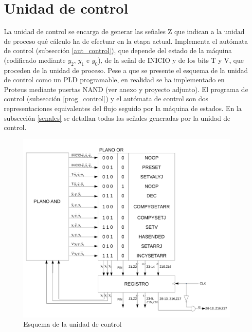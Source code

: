 \documentclass[12pt,a4paper,oneside]{article}
\begin{document}
\section{Unidad de control} \label{ud_control}
La unidad de control se encarga de generar las señales Z que indican a la unidad de proceso qué 
cálculo ha de efectuar en la etapa actual. Implementa el autómata de control (subsección \ref{aut_control}), que depende del estado 
de la máquina (codificado mediante $y_2$, $y_1$ e $y_0$), de la señal de INICIO y de los bits T y V, 
que proceden de la unidad de proceso. Pese a que se presente el esquema de la unidad de control como 
un PLD programable, en realidad se ha implementado en Proteus mediante puertas NAND (ver anexo y proyecto adjunto).
El programa de control (subsección \ref{prog_control}) y el autómata de control son dos 
representaciones equivalentes del flujo seguido por la máquina de estados. En la subsección \ref{senales} se 
detallan todas las señales generadas por la unidad de control.
\begin{figure}[H]
    \includegraphics[width = \textwidth]{ud_control.pdf}
    \caption{Esquema de la unidad de control}
\end{figure}
\end{document}
